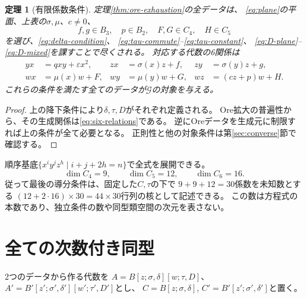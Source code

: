 \documentclass[11pt,a4paper]{ltjsarticle}
\newtheorem{theorem}{定理}[section]
\theoremstyle{definition}
\newcommand{\Gclass}{\mathcal G}
\begin{document}
\begin{theorem}[有限係数条件]\label{thm:coefficient-data}
定理\ref{thm:ore-exhaustion}の全データは、
\eqref{eq:plane}の平面、上表の$\sigma,\mu$、$c\ne0$、
\[
f,g\in B_3,\quad p\in B_2,\quad F,G\in C_4,\quad H\in C_5
\]
を選び、\eqref{eq:delta-condition}、
\eqref{eq:tau-commute}--\eqref{eq:tau-constant}、
\eqref{eq:D-plane}--\eqref{eq:D-mixed}を課すことで尽くされる。
対応する代数の6関係は
\begin{equation}\label{eq:six-relations}
\begin{aligned}
yx&=qxy+\varepsilon x^2,&
zx&=\sigma(x)z+f,& zy&=\sigma(y)z+g,\\
wx&=\mu(x)w+F,&
wy&=\mu(y)w+G,& wz&=(cz+p)w+H.
\end{aligned}
\end{equation}
これらの条件を満たす全てのデータが$\Gclass$の対象を与える。
\end{theorem}
\begin{proof}
上の降下条件により$\delta,\tau,D$がそれぞれ定義される。
Ore拡大の普遍性から、その生成関係は\eqref{eq:six-relations}である。
逆にOreデータを生成元に制限すれば上の条件が全て必要となる。
正則性と他の対象条件は第\ref{sec:converse}節で確認する。
\end{proof}

順序基底$\{x^iy^jz^h\mid i+j+2h=n\}$で全式を展開できる。
\[
\dim C_4=9,\qquad \dim C_5=12,\qquad \dim C_6=16.
\]
従って最後の導分条件は、固定した$C,\tau$の下で
$9+9+12=30$係数を未知数とする
$(12+2\cdot16)\times30=44\times30$行列の核として記述できる。
この数は方程式の本数であり、独立条件の数や同型類空間の次元を表さない。

\section{全ての次数付き同型}\label{sec:isomorphism}
2つのデータから作る代数を
$A=B[z;\sigma,\delta][w;\tau,D]$、
$A'=B'[z';\sigma',\delta'][w';\tau',D']$とし、
$C=B[z;\sigma,\delta]$, $C'=B'[z';\sigma',\delta']$と置く。
\end{document}
